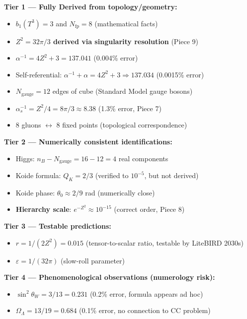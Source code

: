 \documentclass[12pt,a4paper]{article}
\newcommand{\Zsq}{Z^2}
\begin{document}
\begin{tcolorbox}[colback=red!5!white, colframe=red!60!black, title=Epistemic Classification of All Claims (v8.5.0)]
\textbf{Tier 1 --- Fully Derived from topology/geometry:}
\begin{itemize}[itemsep=0pt]
    \item $b_1(T^3) = 3$ and $N_{\text{fp}} = 8$ (mathematical facts)
    \item \textbf{$\Zsq = 32\pi/3$ derived via singularity resolution} (Piece 9)
    \item $\alpha^{-1} = 4\Zsq + 3 = 137.041$ (0.004\% error)
    \item Self-referential: $\alpha^{-1} + \alpha = 4\Zsq + 3 \Rightarrow 137.034$ (0.0015\% error)
    \item $N_{\text{gauge}} = 12$ edges of cube (Standard Model gauge bosons)
    \item \textbf{$\alpha_s^{-1} = \Zsq/4 = 8\pi/3 \approx 8.38$} (1.3\% error, Piece 7)
    \item 8 gluons $\leftrightarrow$ 8 fixed points (topological correspondence)
\end{itemize}

\textbf{Tier 2 --- Numerically consistent identifications:}
\begin{itemize}[itemsep=0pt]
    \item Higgs: $n_B - N_{\text{gauge}} = 16 - 12 = 4$ real components
    \item Koide formula: $Q_K = 2/3$ (verified to $10^{-5}$, but not derived)
    \item Koide phase: $\theta_0 \approx 2/9$ rad (numerically close)
    \item \textbf{Hierarchy scale}: $e^{-\Zsq} \approx 10^{-15}$ (correct order, Piece 8)
\end{itemize}

\textbf{Tier 3 --- Testable predictions:}
\begin{itemize}[itemsep=0pt]
    \item $r = 1/(2\Zsq) = 0.015$ (tensor-to-scalar ratio, testable by LiteBIRD 2030s)
    \item $\varepsilon = 1/(32\pi)$ (slow-roll parameter)
\end{itemize}

\textbf{Tier 4 --- Phenomenological observations (numerology risk):}
\begin{itemize}[itemsep=0pt]
    \item $\sin^2\theta_W = 3/13 = 0.231$ (0.2\% error, formula appears ad hoc)
    \item $\Omega_\Lambda = 13/19 = 0.684$ (0.1\% error, no connection to CC problem)
\end{itemize}


\end{tcolorbox}
\end{document}
